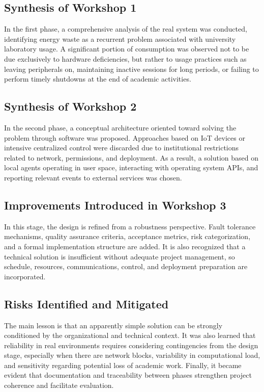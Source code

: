 \documentclass[12pt,a4paper]{article}
\begin{document}
\subsection{Synthesis of Workshop 1}
In the first phase, a comprehensive analysis of the real system was conducted, identifying energy waste as a recurrent problem associated with university laboratory usage. A significant portion of consumption was observed not to be due exclusively to hardware deficiencies, but rather to usage practices such as leaving peripherals on, maintaining inactive sessions for long periods, or failing to perform timely shutdowns at the end of academic activities.

\subsection{Synthesis of Workshop 2}
In the second phase, a conceptual architecture oriented toward solving the problem through software was proposed. Approaches based on IoT devices or intensive centralized control were discarded due to institutional restrictions related to network, permissions, and deployment. As a result, a solution based on local agents operating in user space, interacting with operating system APIs, and reporting relevant events to external services was chosen.

\subsection{Improvements Introduced in Workshop 3}
In this stage, the design is refined from a robustness perspective. Fault tolerance mechanisms, quality assurance criteria, acceptance metrics, risk categorization, and a formal implementation structure are added. It is also recognized that a technical solution is insufficient without adequate project management, so schedule, resources, communications, control, and deployment preparation are incorporated.

\subsection{Risks Identified and Mitigated}
The main lesson is that an apparently simple solution can be strongly conditioned by the organizational and technical context. It was also learned that reliability in real environments requires considering contingencies from the design stage, especially when there are network blocks, variability in computational load, and sensitivity regarding potential loss of academic work. Finally, it became evident that documentation and traceability between phases strengthen project coherence and facilitate evaluation.
\end{document}
